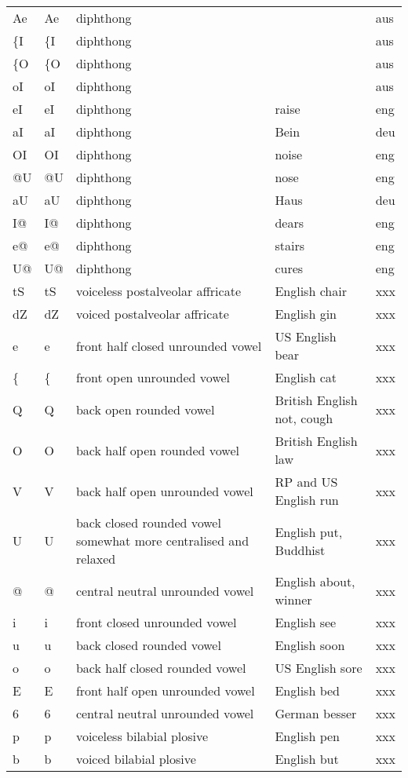 \begin{longtable}{llp{}ll}
	Ae & Ae & diphthong & & aus\\
	\{I & \{I & diphthong & & aus\\
	\{O & \{O & diphthong & & aus\\
	oI & oI & diphthong & & aus\\
	eI & eI & diphthong & raise & eng\\
	aI & aI & diphthong & Bein & deu\\
	OI & OI & diphthong & noise & eng\\
	@U & @U & diphthong & nose & eng\\
	aU & aU & diphthong & Haus & deu\\
	I@ & I@ & diphthong & dears & eng\\
	e@ & e@ & diphthong & stairs & eng\\
	U@ & U@ & diphthong & cures & eng\\
	tS & tS & voiceless postalveolar affricate & English chair & xxx\\
	dZ & dZ & voiced postalveolar affricate & English gin & xxx\\
	e & e & front half closed unrounded vowel & US English bear & xxx\\
	\{ & \{ & front open unrounded vowel & English cat & xxx\\
	Q & Q & back open rounded vowel & British English not, cough & xxx\\
	O & O & back half open rounded vowel & British English law & xxx\\
	V & V & back half open unrounded vowel & RP and US English run & xxx\\
	U & U & back closed rounded vowel somewhat more centralised and relaxed & English put, Buddhist & xxx\\
	@ & @ & central neutral unrounded vowel & English about, winner & xxx\\
	i & i & front closed unrounded vowel & English see & xxx\\
	u & u & back closed rounded vowel & English soon & xxx\\
	o & o & back half closed rounded vowel & US English sore & xxx\\
	E & E & front half open unrounded vowel & English bed & xxx\\
	6 & 6 & central neutral unrounded vowel & German besser & xxx\\
	p & p & voiceless bilabial plosive & English pen & xxx\\
	b & b & voiced bilabial plosive & English but & xxx\\

\end{longtable}
